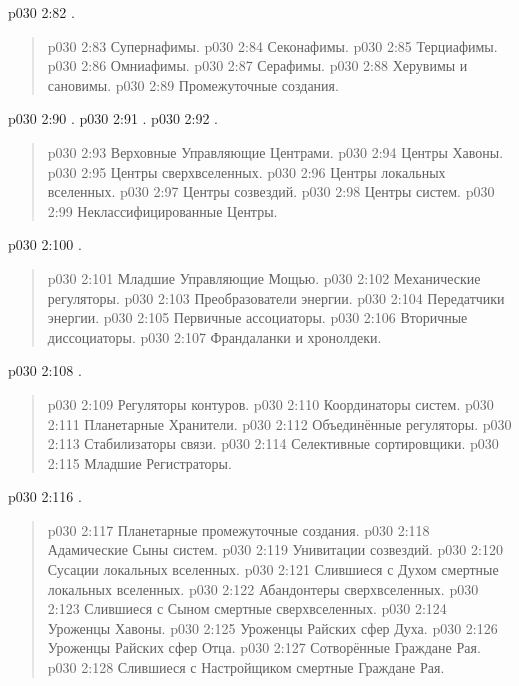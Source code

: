 \vs p030 2:82 .
\begin{quote}
\vs p030 2:83 Супернафимы.
\vs p030 2:84 Секонафимы.
\vs p030 2:85 Терциафимы.
\vs p030 2:86 Омниафимы.
\vs p030 2:87 Серафимы.
\vs p030 2:88 Херувимы и сановимы.
\vs p030 2:89 Промежуточные создания.
\end{quote}
\vs p030 2:90 .
\vs p030 2:91 .
\vs p030 2:92 .
\begin{quote}
\vs p030 2:93 Верховные Управляющие Центрами.
\vs p030 2:94 Центры Хавоны.
\vs p030 2:95 Центры сверхвселенных.
\vs p030 2:96 Центры локальных вселенных.
\vs p030 2:97 Центры созвездий.
\vs p030 2:98 Центры систем.
\vs p030 2:99 Неклассифицированные Центры.
\end{quote}
\vs p030 2:100 .
\begin{quote}
\vs p030 2:101 Младшие Управляющие Мощью.
\vs p030 2:102 Механические регуляторы.
\vs p030 2:103 Преобразователи энергии.
\vs p030 2:104 Передатчики энергии.
\vs p030 2:105 Первичные ассоциаторы.
\vs p030 2:106 Вторичные диссоциаторы.
\vs p030 2:107 Франдаланки и хронолдеки.
\end{quote}
\vs p030 2:108 .
\begin{quote}
\vs p030 2:109 Регуляторы контуров.
\vs p030 2:110 Координаторы систем.
\vs p030 2:111 Планетарные Хранители.
\vs p030 2:112 Объединённые регуляторы.
\vs p030 2:113 Стабилизаторы связи.
\vs p030 2:114 Селективные сортировщики.
\vs p030 2:115 Младшие Регистраторы.
\end{quote}
\vs p030 2:116 .
\begin{quote}
\vs p030 2:117 Планетарные промежуточные создания.
\vs p030 2:118 Адамические Сыны систем.
\vs p030 2:119 Унивитации созвездий.
\vs p030 2:120 Сусации локальных вселенных.
\vs p030 2:121 Слившиеся с Духом смертные локальных вселенных.
\vs p030 2:122 Абандонтеры сверхвселенных.
\vs p030 2:123 Слившиеся с Сыном смертные сверхвселенных.
\vs p030 2:124 Уроженцы Хавоны.
\vs p030 2:125 Уроженцы Райских сфер Духа.
\vs p030 2:126 Уроженцы Райских сфер Отца.
\vs p030 2:127 Сотворённые Граждане Рая.
\vs p030 2:128 Слившиеся с Настройщиком смертные Граждане Рая.
\end{quote}
